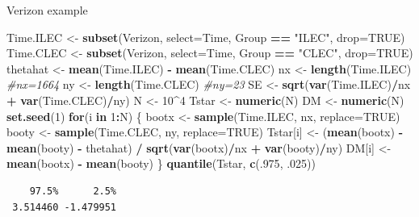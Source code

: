 \documentclass[
  ignorenonframetext,
]{beamer}
\newenvironment{Shaded}{\begin{snugshade}}{\end{snugshade}}
\newcommand{\AttributeTok}[1]{\textcolor[rgb]{0.13,0.29,0.53}{#1}}
\newcommand{\CommentTok}[1]{\textcolor[rgb]{0.56,0.35,0.01}{\textit{#1}}}
\newcommand{\ConstantTok}[1]{\textcolor[rgb]{0.56,0.35,0.01}{#1}}
\newcommand{\ControlFlowTok}[1]{\textcolor[rgb]{0.13,0.29,0.53}{\textbf{#1}}}
\newcommand{\DecValTok}[1]{\textcolor[rgb]{0.00,0.00,0.81}{#1}}
\newcommand{\FunctionTok}[1]{\textcolor[rgb]{0.13,0.29,0.53}{\textbf{#1}}}
\newcommand{\NormalTok}[1]{#1}
\newcommand{\OtherTok}[1]{\textcolor[rgb]{0.56,0.35,0.01}{#1}}
\newcommand{\SpecialCharTok}[1]{\textcolor[rgb]{0.81,0.36,0.00}{\textbf{#1}}}
\newcommand{\StringTok}[1]{\textcolor[rgb]{0.31,0.60,0.02}{#1}}
\begin{document}
\begin{frame}[fragile]{Verizon example}
\label{verizon-example}
\tiny

\begin{Shaded}
\begin{Highlighting}[]
\NormalTok{Time.ILEC }\OtherTok{\textless{}{-}} \FunctionTok{subset}\NormalTok{(Verizon, }\AttributeTok{select=}\NormalTok{Time, Group }\SpecialCharTok{==} \StringTok{"ILEC"}\NormalTok{, }\AttributeTok{drop=}\ConstantTok{TRUE}\NormalTok{)}
\NormalTok{Time.CLEC }\OtherTok{\textless{}{-}} \FunctionTok{subset}\NormalTok{(Verizon, }\AttributeTok{select=}\NormalTok{Time, Group }\SpecialCharTok{==} \StringTok{"CLEC"}\NormalTok{, }\AttributeTok{drop=}\ConstantTok{TRUE}\NormalTok{)}
\NormalTok{thetahat }\OtherTok{\textless{}{-}} \FunctionTok{mean}\NormalTok{(Time.ILEC) }\SpecialCharTok{{-}} \FunctionTok{mean}\NormalTok{(Time.CLEC)}
\NormalTok{nx }\OtherTok{\textless{}{-}} \FunctionTok{length}\NormalTok{(Time.ILEC)  }\CommentTok{\#nx=1664}
\NormalTok{ny }\OtherTok{\textless{}{-}} \FunctionTok{length}\NormalTok{(Time.CLEC)  }\CommentTok{\#ny=23}
\NormalTok{SE }\OtherTok{\textless{}{-}} \FunctionTok{sqrt}\NormalTok{(}\FunctionTok{var}\NormalTok{(Time.ILEC)}\SpecialCharTok{/}\NormalTok{nx }\SpecialCharTok{+} \FunctionTok{var}\NormalTok{(Time.CLEC)}\SpecialCharTok{/}\NormalTok{ny)}
\NormalTok{N }\OtherTok{\textless{}{-}} \DecValTok{10}\SpecialCharTok{\^{}}\DecValTok{4}
\NormalTok{Tstar }\OtherTok{\textless{}{-}} \FunctionTok{numeric}\NormalTok{(N)}
\NormalTok{DM }\OtherTok{\textless{}{-}} \FunctionTok{numeric}\NormalTok{(N)}
\FunctionTok{set.seed}\NormalTok{(}\DecValTok{1}\NormalTok{)}
\ControlFlowTok{for}\NormalTok{(i }\ControlFlowTok{in} \DecValTok{1}\SpecialCharTok{:}\NormalTok{N)}
\NormalTok{\{}
\NormalTok{  bootx }\OtherTok{\textless{}{-}} \FunctionTok{sample}\NormalTok{(Time.ILEC, nx, }\AttributeTok{replace=}\ConstantTok{TRUE}\NormalTok{)}
\NormalTok{  booty }\OtherTok{\textless{}{-}} \FunctionTok{sample}\NormalTok{(Time.CLEC, ny, }\AttributeTok{replace=}\ConstantTok{TRUE}\NormalTok{)}
\NormalTok{  Tstar[i] }\OtherTok{\textless{}{-}}\NormalTok{ (}\FunctionTok{mean}\NormalTok{(bootx) }\SpecialCharTok{{-}} \FunctionTok{mean}\NormalTok{(booty) }\SpecialCharTok{{-}}\NormalTok{ thetahat) }\SpecialCharTok{/}
    \FunctionTok{sqrt}\NormalTok{(}\FunctionTok{var}\NormalTok{(bootx)}\SpecialCharTok{/}\NormalTok{nx }\SpecialCharTok{+} \FunctionTok{var}\NormalTok{(booty)}\SpecialCharTok{/}\NormalTok{ny)}
\NormalTok{  DM[i] }\OtherTok{\textless{}{-}} \FunctionTok{mean}\NormalTok{(bootx) }\SpecialCharTok{{-}} \FunctionTok{mean}\NormalTok{(booty)}
\NormalTok{\}}
\FunctionTok{quantile}\NormalTok{(Tstar, }\FunctionTok{c}\NormalTok{(.}\DecValTok{975}\NormalTok{, .}\DecValTok{025}\NormalTok{))}
\end{Highlighting}
\end{Shaded}

\begin{verbatim}
    97.5%      2.5% 
 3.514460 -1.479951 
\end{verbatim}

\normalsize
\end{frame}
\end{document}
